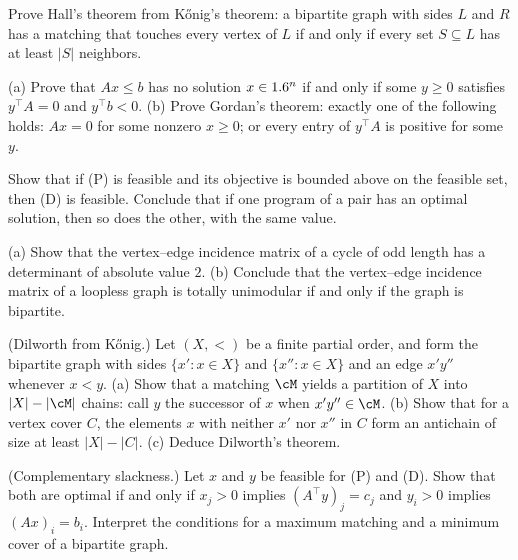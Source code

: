 \begin{refsection}
\begin{exercises}
\item \consolidation Prove Hall's theorem from K\H{o}nig's theorem: a bipartite graph with sides $L$ and $R$ has a matching that touches every vertex of $L$ if and only if every set $S\subseteq L$ has at least $|S|$ neighbors.\label{ex:lpduality:hall}

\item \consolidation (a) Prove that $Ax\le b$ has no solution $x\in1.6^n$ if and only if some $y\ge0$ satisfies $y^\top A=0$ and $y^\top b<0$. (b) Prove Gordan's theorem: exactly one of the following holds: $Ax=0$ for some nonzero $x\ge0$; or every entry of $y^\top A$ is positive for some $y$.\label{ex:lpduality:gordan}

\item \consolidation\hard Show that if (P) is feasible and its objective is bounded above on the feasible set, then (D) is feasible. Conclude that if one program of a pair has an optimal solution, then so does the other, with the same value. \label{ex:lpduality:bounded}

\item \consolidation (a) Show that the vertex--edge incidence matrix of a cycle of odd length has a determinant of absolute value $2$. (b) Conclude that the vertex--edge incidence matrix of a loopless graph is totally unimodular if and only if the graph is bipartite.\label{ex:lpduality:odd}

\item \consolidation (Dilworth from K\H{o}nig.) Let $(X,<)$ be a finite partial order, and form the bipartite graph with sides $\{x':x\in X\}$ and $\{x'':x\in X\}$ and an edge $x'y''$ whenever $x<y$. (a) Show that a matching $\cM$ yields a partition of $X$ into $|X|-|\cM|$ chains: call $y$ the successor of $x$ when $x'y''\in\cM$. (b) Show that for a vertex cover $C$, the elements $x$ with neither $x'$ nor $x''$ in $C$ form an antichain of size at least $|X|-|C|$. (c) Deduce Dilworth's theorem.\label{ex:lpduality:dilworth}

\item \consolidation (Complementary slackness.) Let $x$ and $y$ be feasible for (P) and (D). Show that both are optimal if and only if $x_j>0$ implies $(A^\top y)_j=c_j$ and $y_i>0$ implies $(Ax)_i=b_i$. Interpret the conditions for a maximum matching and a minimum cover of a bipartite graph.\label{ex:lpduality:cs}


\end{exercises}
\end{refsection}

